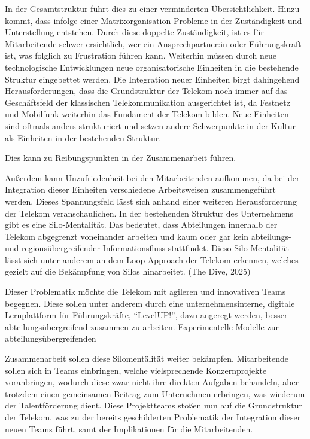 \documentclass[12pt,a4paper]{article}
\newcommand{\zitat}[1]{\parencite{#1}}
\begin{document}
	\noindent In der Gesamtstruktur führt dies zu einer verminderten
	Übersichtlichkeit. Hinzu kommt, dass infolge einer Matrixorganisation
	Probleme in der Zuständigkeit und Unterstellung entstehen. Durch diese
	doppelte Zuständigkeit, ist es für Mitarbeitende schwer ersichtlich, wer
	ein Ansprechpartner:in oder Führungskraft ist, was folglich zu
	Frustration führen kann. Weiterhin müssen durch neue technologische
	Entwicklungen neue organisatorische Einheiten in die bestehende Struktur
	eingebettet werden. Die Integration neuer Einheiten birgt dahingehend
	Herausforderungen, dass die Grundstruktur der Telekom noch immer auf das
	Geschäftsfeld der klassischen Telekommunikation ausgerichtet ist, da
	Festnetz und Mobilfunk weiterhin das Fundament der Telekom bilden. Neue
	Einheiten sind oftmals anders strukturiert und setzen andere
	Schwerpunkte in der Kultur als Einheiten in der bestehenden Struktur.
	
	\noindent \zitat{geissel2023} Dies kann zu Reibungspunkten in der Zusammenarbeit
	führen.
	
	\noindent Außerdem kann Unzufriedenheit bei den Mitarbeitenden aufkommen, da bei
	der Integration dieser Einheiten verschiedene Arbeitsweisen
	zusammengeführt werden. \parencite[336]{vahs2023b} Dieses
	Spannungsfeld lässt sich anhand einer weiteren Herausforderung der
	Telekom veranschaulichen. In der bestehenden Struktur des Unternehmens
	gibt es eine Silo-Mentalität. Das bedeutet, dass Abteilungen innerhalb
	der Telekom abgegrenzt voneinander arbeiten und kaum oder gar kein
	abteilungs- und regionsübergreifender Informationsfluss stattfindet.
	\zitat{wehr202x} Dieso Silo-Mentalität lässt sich unter anderem an dem Loop
	Approach der Telekom erkennen, welches gezielt auf die Bekämpfung von
	Silos hinarbeitet. \zitat{dive} (The Dive, 2025)
	
	\noindent Dieser Problematik möchte die Telekom mit agileren und innovativen Teams
	begegnen. Diese sollen unter anderem durch eine unternehmensinterne,
	digitale Lernplattform für Führungskräfte, ``LevelUP!'', dazu angeregt
	werden, besser abteilungsübergreifend zusammen zu arbeiten.
	Experimentelle Modelle zur abteilungsübergreifenden
	
	\noindent Zusammenarbeit sollen diese Silomentälität weiter bekämpfen.
	Mitarbeitende sollen sich in Teams einbringen, welche vielsprechende
	Konzernprojekte voranbringen, wodurch diese zwar nicht ihre direkten
	Aufgaben behandeln, aber trotzdem einen gemeinsamen Beitrag zum
	Unternehmen erbringen, was wiederum der Talentförderung dient. \zitat{illek2017} Diese Projektteams stoßen nun auf die Grundstruktur der Telekom,
	was zu der bereits geschilderten Problematik der Integration dieser
	neuen Teams führt, samt der Implikationen für die Mitarbeitenden.
	
\end{document}
